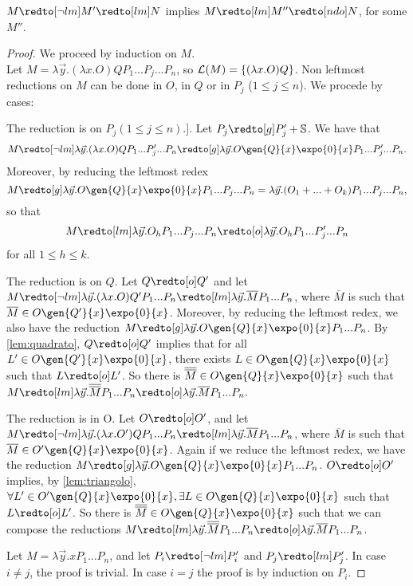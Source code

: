 \begin{lemma}[Inversion] \label{lem:inversion}
$M \redto[\neg lm] M'  \redto[lm] N $ implies $M  \redto[lm] M'' \redto[ndo] N$, for some $M''$.
\end{lemma}
\begin{proof}
We proceed by induction on $M$.\\
Let $M = \lambda \vec{y} .(\lambda x.O)Q P_1...P_j...P_n$, so ${\cal L}(M)=\{(\lambda x.O)Q\}$.
Non leftmost reductions on $M$ can be done in $O$, in $Q$ or in $P_j$ ($1 \leq j \leq n$). We procede by cases:
\begin{enumcases}
\item The reduction is on $P_j (1 \leq j \leq n)$.].
Let $P_j \redto[g] P'_j + \mathbb{S}$.
We have that
$$M \redto[\neg lm] \lambda \vec{y}. (\lambda x.O) Q P_1 ... P'_j ... P_n \redto[g]
\lambda \vec{y}.O \gen{Q}{x}\expo{0}{x} P_1 ... P'_j ... P_n.$$
Moreover, by reducing the leftmost redex
$$M \redto[g] \lambda \vec{y}.O \gen{Q}{x} \expo{0}{x} P_1 ... P_j ... P_n =
\lambda \vec{y}.(O_1 + ... +O_k) P_1 ... P_j ... P_n,
$$
so that
$$M \redto[lm] \lambda \vec{y}.O_h P_1 ... P_j ... P_n \redto[o]
\lambda \vec{y}.O_h P_1 ... P'_j ... P_n$$
for all $1\leq h \leq k$.

\item The reduction is on $Q$.
Let $Q \redto[o] Q'$ and let $M \redto[\neg lm] \lambda \vec{y}.(\lambda x.O)Q' P_1 ... P_n  \redto[lm]
\lambda \vec{y}. \overline{M} P_1 ... P_n$, where $\overline M$ is such that
$\overline{M} \in O\gen{Q'}{x} \expo{0}{x} $.
Moreover, by reducing the leftmost redex, we also have the reduction
$M \redto[g] \lambda \vec{y}. O\gen{Q}{x} \expo{0}{x} P_1 ... P_n $.
By \autoref{lem:quadrato}, $Q \redto[o]Q'$ implies that for all $L'\in O\gen{Q'}{x} \expo{0}{x}$,
there exists $
L \in O\gen{Q}{x} \expo{0}{x}$ such that $L \redto[o] L'$.
So there is $\overline{\overline{M}}\in O\gen{Q}{x}\expo{0}{x}$ such that
$M \redto[lm] \lambda \vec{y}. \overline{\overline{M}}  P_1 ... P_n \redto[o] \lambda \vec{y}. \overline{M} P_1 ... P_n.$

\item The reduction is in O.
Let $O \redto[o] O' $, and let
$M \redto[\neg lm] \lambda \vec{y}.(\lambda x.O')Q P_1...P_n \redto[lm] \lambda \vec{y}. \overline{M}P_1...P_n$,
where $\overline{M}$ is such that $\overline M \in O'\gen{Q}{x} \expo{0}{x}$.
Again if we reduce the leftmost redex, we have the reduction
$M \redto[g] \lambda \vec{y}. O \gen{Q}{x} \expo{0}{x} P_1 ... P_n$.
$O \redto[o]O'$ implies, by \autoref{lem:triangolo}, $\forall L' \in O'\gen{Q}{x} \expo{0}{x},
 \exists L \in O \gen{Q}{x} \expo{0}{x}$ such that
$L \redto[o] L'$. So there is $\overline{\overline{M}}\in O \gen{Q}{x} \expo{0}{x}$ such that we
can compose the reductions
$M \redto[lm] \lambda \vec{y}. \overline{\overline{M}}  P_1 ... P_n \redto[o] \lambda \vec{y}.\overline{M}
 P_1 ... P_n $.
\end{enumcases}

Let $M=\lambda \vec{y}.x P_1 ... P_n$, and let $P_{i} \redto[\neg lm]P'_{i}$ and $P_{j} \redto[lm]P'_{j}$.
In case $i \not = j$, the proof is trivial. In case $i=j$ the proof is by induction on $P_{i}$.\qedhere

\end{proof}
